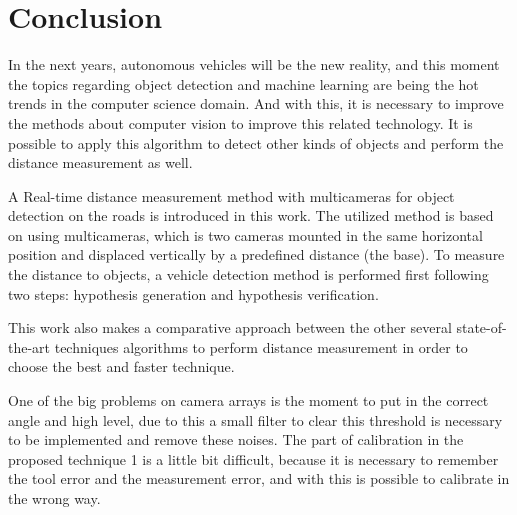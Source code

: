 \chapter{Conclusion}
\label{capitulo6}


In the next years, autonomous vehicles will be the new reality, and this moment the topics regarding object detection and machine learning are being the hot trends in the computer science domain. And with this, it is necessary to improve the methods about computer vision to improve this related technology. It is possible to apply this algorithm to detect other kinds of objects and perform the distance measurement as well. 

A Real-time distance measurement method with multicameras for object detection on the roads is introduced in this work. The utilized method is based on using multicameras, which is two cameras mounted in the same horizontal position and displaced vertically by a predefined distance (the base). To measure the distance to objects, a vehicle detection method is performed first following two steps: hypothesis generation and hypothesis verification. 


This work also makes a comparative approach between the other several state-of-the-art techniques algorithms to perform distance measurement in order to choose the best and faster technique. 

One of the big problems on camera arrays is the moment to put in the correct angle and high level, due to this a small filter to clear this threshold is necessary to be implemented and remove these noises. The part of calibration in the proposed technique 1 is a little bit difficult, because it is necessary to remember the tool error and the measurement error, and with this is possible to calibrate in the wrong way. 

